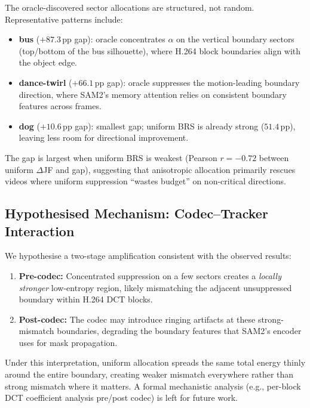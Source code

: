 The oracle-discovered sector allocations are structured, not random.
Representative patterns include:
\begin{itemize}
  \item \textbf{bus} ($+87.3\,\mathrm{pp}$ gap): oracle concentrates $\alpha$ on the vertical boundary sectors (top/bottom of the bus silhouette), where H.264 block boundaries align with the object edge.
  \item \textbf{dance-twirl} ($+66.1\,\mathrm{pp}$ gap): oracle suppresses the motion-leading boundary direction, where SAM2's memory attention relies on consistent boundary features across frames.
  \item \textbf{dog} ($+10.6\,\mathrm{pp}$ gap): smallest gap; uniform BRS is already strong ($51.4\,\mathrm{pp}$), leaving less room for directional improvement.
\end{itemize}

The gap is largest when uniform BRS is weakest (Pearson $r{=}{-}0.72$ between uniform $\Delta$JF and gap), suggesting that anisotropic allocation primarily rescues videos where uniform suppression ``wastes budget'' on non-critical directions.

\subsection{Hypothesised Mechanism: Codec--Tracker Interaction}

We hypothesise a two-stage amplification consistent with the observed results:
\begin{enumerate}
  \item \textbf{Pre-codec:} Concentrated suppression on a few sectors creates a \emph{locally stronger} low-entropy region, likely mismatching the adjacent unsuppressed boundary within H.264 DCT blocks.
  \item \textbf{Post-codec:} The codec may introduce ringing artifacts at these strong-mismatch boundaries, degrading the boundary features that SAM2's encoder uses for mask propagation.
\end{enumerate}
Under this interpretation, uniform allocation spreads the same total energy thinly around the entire boundary, creating weaker mismatch everywhere rather than strong mismatch where it matters.
A formal mechanistic analysis (e.g., per-block DCT coefficient analysis pre/post codec) is left for future work.
